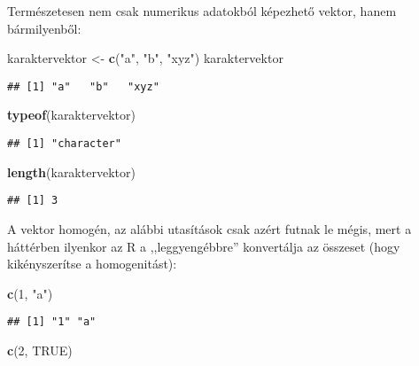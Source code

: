 \documentclass[]{book}
\newenvironment{Shaded}{\begin{snugshade}}{\end{snugshade}}
\newcommand{\DecValTok}[1]{\textcolor[rgb]{0.00,0.00,0.81}{#1}}
\newcommand{\KeywordTok}[1]{\textcolor[rgb]{0.13,0.29,0.53}{\textbf{#1}}}
\newcommand{\NormalTok}[1]{#1}
\newcommand{\OtherTok}[1]{\textcolor[rgb]{0.56,0.35,0.01}{#1}}
\newcommand{\StringTok}[1]{\textcolor[rgb]{0.31,0.60,0.02}{#1}}
\begin{document}
Természetesen nem csak numerikus adatokból képezhető vektor, hanem bármilyenből:

\begin{Shaded}
\begin{Highlighting}[]
\NormalTok{karaktervektor <-}\StringTok{ }\KeywordTok{c}\NormalTok{(}\StringTok{"a"}\NormalTok{, }\StringTok{"b"}\NormalTok{, }\StringTok{"xyz"}\NormalTok{)}
\NormalTok{karaktervektor}
\end{Highlighting}
\end{Shaded}

\begin{verbatim}
## [1] "a"   "b"   "xyz"
\end{verbatim}

\begin{Shaded}
\begin{Highlighting}[]
\KeywordTok{typeof}\NormalTok{(karaktervektor)}
\end{Highlighting}
\end{Shaded}

\begin{verbatim}
## [1] "character"
\end{verbatim}

\begin{Shaded}
\begin{Highlighting}[]
\KeywordTok{length}\NormalTok{(karaktervektor)}
\end{Highlighting}
\end{Shaded}

\begin{verbatim}
## [1] 3
\end{verbatim}

A vektor homogén, az alábbi utasítások csak azért futnak le mégis, mert a háttérben ilyenkor az R a ,,leggyengébbre'' konvertálja az összeset (hogy kikényszerítse a homogenitást):

\begin{Shaded}
\begin{Highlighting}[]
\KeywordTok{c}\NormalTok{(}\DecValTok{1}\NormalTok{, }\StringTok{"a"}\NormalTok{)}
\end{Highlighting}
\end{Shaded}

\begin{verbatim}
## [1] "1" "a"
\end{verbatim}

\begin{Shaded}
\begin{Highlighting}[]
\KeywordTok{c}\NormalTok{(}\DecValTok{2}\NormalTok{, }\OtherTok{TRUE}\NormalTok{)}
\end{Highlighting}
\end{Shaded}
\end{document}
